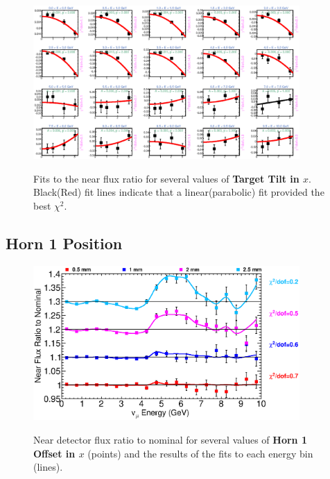 \begin{figure}[hb]
  \begin{center}
    {\includegraphics[width=4.0in]{figures/TargetXTilt_near_fits.eps}}
  \end{center}
\caption{ Fits to the near flux ratio for several values of {\bf Target Tilt in $x$}. Black(Red) fit lines indicate that a linear(parabolic) fit provided the best $\chi^2$. }
\end{figure}

\clearpage
\subsection{Horn 1 Position}

\begin{figure}[ht]
  \begin{center}
    {\includegraphics[width=4.0in]{figures/Horn1XOffset_near_summary.eps}}
  \end{center}
\caption{ Near detector flux ratio to nominal for several values of {\bf Horn 1 Offset in $x$} (points) and the results of the fits to each energy bin (lines).}
\end{figure}

